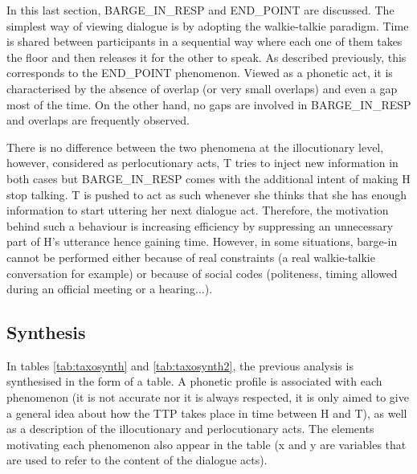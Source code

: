          In this last section, BARGE\_IN\_RESP and END\_POINT are discussed. The simplest way of viewing dialogue is by adopting the walkie-talkie paradigm. Time is shared between participants in a sequential way where each one of them takes the floor and then releases it for the other to speak. As described previously, this corresponds to the END\_POINT phenomenon. Viewed as a phonetic act, it is characterised by the absence of overlap (or very small overlaps) and even a gap most of the time. On the other hand, no gaps are involved in BARGE\_IN\_RESP and overlaps are frequently observed.

         There is no difference between the two phenomena at the illocutionary level, however, considered as perlocutionary acts, T tries to inject new information in both cases but BARGE\_IN\_RESP comes with the additional intent of making H stop talking. T is pushed to act as such whenever she thinks that she has enough information to start uttering her next dialogue act. Therefore, the motivation behind such a behaviour is increasing efficiency by suppressing an unnecessary part of H's utterance hence gaining time. However, in some situations, barge-in cannot be performed either because of real constraints (a real walkie-talkie conversation for example) or because of social codes (politeness, timing allowed during an official meeting or a hearing...).
				
		\subsection{Synthesis}
		
			In tables \ref{tab:taxosynth} and \ref{tab:taxosynth2}, the previous analysis is synthesised in the form of a table. A phonetic profile is associated with each phenomenon (it is not accurate nor it is always respected, it is only aimed to give a general idea about how the TTP takes place in time between H and T), as well as a description of the illocutionary and perlocutionary acts. The elements motivating each phenomenon also appear in the table (x and y are variables that are used to refer to the content of the dialogue acts).
		
